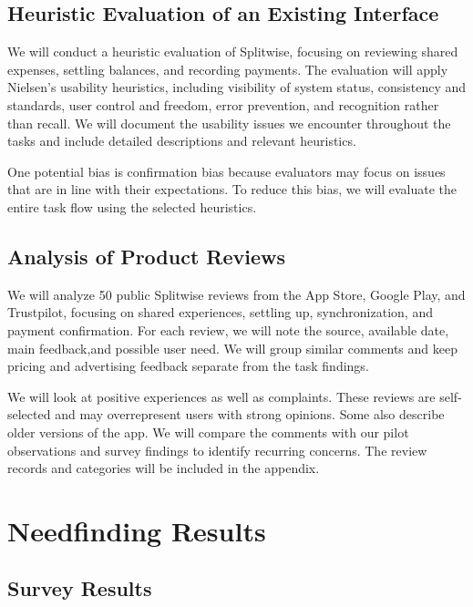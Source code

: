 \documentclass[letterpaper]{jdf}
\begin{document}
\subsection{Heuristic Evaluation of an Existing Interface}

We will conduct a heuristic evaluation of Splitwise, focusing on reviewing shared expenses, settling balances, and recording payments. The evaluation will apply Nielsen's usability heuristics, including visibility of system status, consistency and standards, user control and freedom, error prevention, and recognition rather than recall. We will document the usability issues we encounter throughout the tasks and include detailed descriptions and relevant heuristics.

One potential bias is confirmation bias because evaluators may focus on issues that are in line with their expectations. To reduce this bias, we will evaluate the entire task flow using the selected heuristics.

\subsection{Analysis of Product Reviews}

We will analyze 50 public Splitwise reviews from the App Store, Google Play, and Trustpilot, focusing on shared experiences, settling up, synchronization, and payment confirmation. For each review, we will note the source, available date, main feedback,and possible user need. We will group similar comments and keep pricing and advertising feedback separate from the task findings.

We will look at positive experiences as well as complaints. These reviews are self-selected and may overrepresent users with strong opinions. Some also describe older versions of the app. We will compare the comments with our pilot observations and survey findings to identify recurring concerns.  The review records and categories will be included in the appendix.



\section{Needfinding Results}
\subsection{Survey Results}\label{survey-results}
\end{document}
